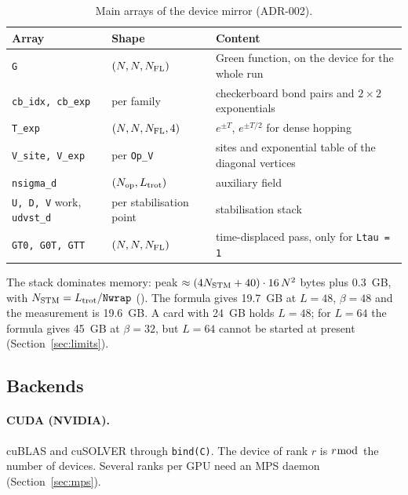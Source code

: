 \begin{table}[h]
\centering
\caption{Main arrays of the device mirror (ADR-002).}
\label{tab:mirror}
\begin{tabular}{@{}lll@{}}
\toprule
Array & Shape & Content \\
\midrule
\texttt{G} & $(N,N,N_{\rm FL})$ & Green function, on the device for the whole run \\ %
\texttt{cb\_idx, cb\_exp} & per family & checkerboard bond pairs and $2\times2$ exponentials \\ %
\texttt{T\_exp} & $(N,N,N_{\rm FL},4)$ & $e^{\pm T}$, $e^{\pm T/2}$ for dense hopping \\ %
\texttt{V\_site, V\_exp} & per \texttt{Op\_V} & sites and exponential table of the diagonal vertices \\ %
\texttt{nsigma\_d} & $(N_{\rm op},L_{\rm trot})$ & auxiliary field \\ %
\texttt{U, D, V} work, \texttt{udvst\_d} & per stabilisation point & stabilisation stack \\ %
\texttt{GT0, G0T, GTT} & $(N,N,N_{\rm FL})$ & time-displaced pass, only for \texttt{Ltau = 1} \\ %
\bottomrule
\end{tabular}
\end{table}

The stack dominates memory: peak $\approx(4N_{\rm STM}+40)\cdot16\,N^2$ bytes plus 0.3~GB, with $N_{\rm STM}=L_{\rm trot}/\texttt{Nwrap}$ (). The formula gives 19.7~GB at $L=48$, $\beta=48$ and the measurement is 19.6~GB. A card with 24~GB holds $L=48$; for $L=64$ the formula gives 45~GB at $\beta=32$, but $L=64$ cannot be started at present (Section~\ref{sec:limits}).

\subsection{Backends}

\paragraph{CUDA (NVIDIA).} cuBLAS and cuSOLVER through \texttt{bind(C)}. The device of rank $r$ is $r \bmod$ the number of devices. Several ranks per GPU need an MPS daemon (Section~\ref{sec:mps}).

